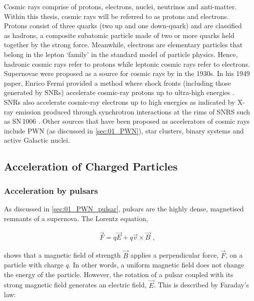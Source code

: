 \newpar
Cosmic rays comprise of protons, electrons, nuclei, neutrinos and anti-matter. Within this thesis, cosmic rays will be referred to as protons and electrons. Protons consist of three quarks (two up and one down-quark) and are classified as hadrons, a composite subatomic particle made of two or more quarks held together by the strong force. Meanwhile, electrons are elementary particles that belong in the lepton `family' in the standard model of particle physics. Hence, hadronic cosmic rays refer to protons while leptonic cosmic rays refer to electrons.
\newpar 
Supernovae were proposed as a source for cosmic rays by \cite{1934PNAS...20..259B} in the 1930s. In his 1949 paper, Enrico Fermi provided a method where shock fronts (including those generated by SNRs) accelerate cosmic-ray protons up to ultra-high energies \citep{1949PhRv...75.1169F}. SNRs also accelerate cosmic-ray electrons up to high energies as indicated by X-ray emission produced through synchrotron interactions at the rims of SNRS such as \mbox{SN\,1006} \citep{1995Natur.378..255K}.
\newpar
Other sources that have been proposed as accelerators of cosmic rays include PWN (as discussed in \autoref{sec:01_PWN}), star clusters, binary systems and active Galactic nuclei.

\subsection{Acceleration of Charged Particles}

\subsubsection{Acceleration by pulsars}

As discussed in \autoref{sec:01_PWN_pulsar}, pulsars are the highly dense, magnetised remnants of a supernova. The Lorentz equation,

\begin{equation}
    \begin{aligned}
        \vec{F}=q\vec{E} + q\vec{v}\times \vec{B}\text{ ,}
    \end{aligned} \label{eq:chapter_1_lorentz_force}
\end{equation}

\noindent shows that a magnetic field of strength $\vec{B}$ applies a perpendicular force, $\vec{F}$, on a particle with charge $q$. In other words, a uniform magnetic field does not change the energy of the particle. However, the rotation of a pulsar coupled with its strong magnetic field generates an electric field, $\vec{E}$. This is described by Faraday's law:
 
